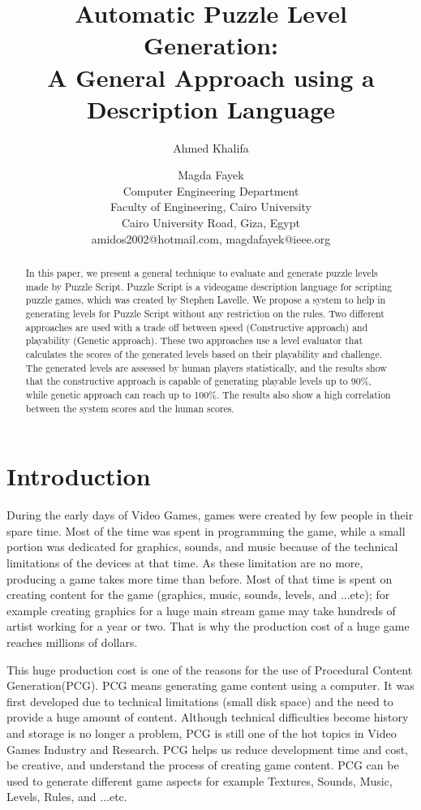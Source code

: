 \documentclass[letterpaper]{article}
\title{Automatic Puzzle Level Generation:\\
A General Approach using a Description Language}
\author{Ahmed Khalifa \and Magda Fayek\\
Computer Engineering Department\\
Faculty of Engineering, Cairo University\\
Cairo University Road, Giza, Egypt\\
amidos2002@hotmail.com, magdafayek@ieee.org\\
}
\begin{document}
 
\maketitle
\begin{abstract}
In this paper, we present a general technique to evaluate and generate puzzle levels made by Puzzle Script. Puzzle Script is a videogame description language for scripting puzzle games, which was created by Stephen Lavelle\cite{puzzleScript}. We propose a system to help in generating levels for Puzzle Script without any restriction on the rules. Two different approaches are used with a trade off between speed (Constructive approach) and playability (Genetic approach). These two approaches use a level evaluator that calculates the scores of the generated levels based on their playability and challenge. The generated levels are assessed by human players statistically, and the results show that the constructive approach is capable of generating playable levels up to 90\%, while genetic approach can reach up to 100\%. The results also show a high correlation between the system scores and the human scores.
\end{abstract}

\section{Introduction}
During the early days of Video Games, games were created by few people in their spare time. Most of the time was spent in programming the game, while a small portion was dedicated for graphics, sounds, and music because of the technical limitations of the devices at that time. As these limitation are no more, producing a game takes more time than before. Most of that time is spent on creating content for the game (graphics, music, sounds, levels, and ...etc)\cite{budgetAAA}; for example creating graphics for a huge main stream game may take hundreds of artist working for a year or two. That is why the production cost of a huge game reaches millions of dollars\cite{gameCost}.\\\par

This huge production cost is one of the reasons for the use of Procedural Content Generation(PCG). PCG means generating game content using a computer. It was first developed due to technical limitations (small disk space) and the need to provide a huge amount of content\cite{pcgFirstGame}. Although technical difficulties become history and storage is no longer a problem, PCG is still one of the hot topics in Video Games Industry and Research. PCG helps us reduce development time and cost, be creative, and understand the process of creating game content. PCG can be used to generate different game aspects for example Textures, Sounds, Music, Levels, Rules, and ...etc.\\\par
\end{document}

